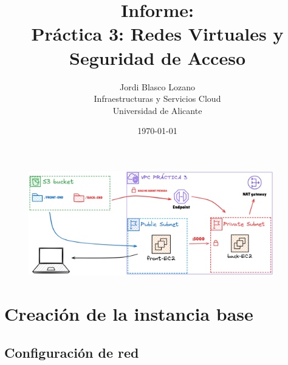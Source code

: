 \documentclass{article}
\title{Informe: \\ Práctica 3: Redes Virtuales y Seguridad de Acceso}
\author{
	Jordi Blasco Lozano \\
	\small Infraestructuras y Servicios Cloud \\
	\small Universidad de Alicante
}
\date{\today}
\begin{document}
	
	\maketitle

	\begin{abstract}
	\noindent 
	\end{abstract}
	\begin{figure}[H]
	\centering
	\includegraphics[width=0.95\textwidth]{esquema.png}
	\end{figure}


	\tableofcontents

	\newpage

	\section{Creación de la instancia base}

		
	\subsection{Configuración de red}
\end{document}
